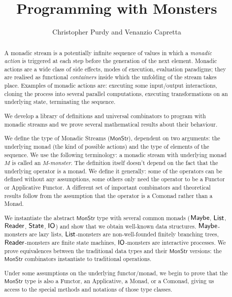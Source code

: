 \documentclass{article}
\title{Programming with Monsters}
\author{Christopher Purdy and Venanzio Capretta}
\begin{document}


\maketitle

\begin{abstract}
A monadic stream is a potentially infinite sequence of values in which a {\em monadic action} is triggered at each step before the generation of the next element.
Monadic actions are a wide class of side effects, modes of execution, evaluation paradigms; they are realised as functional {\em containers} inside which the unfolding of the stream takes place.
Examples of monadic actions are: executing some input/output interactions, cloning the process into several parallel computations, executing transformations on an underlying state, terminating the sequence.

We develop a library of definitions and universal combinators to program with monadic streams and we prove several mathematical results about their behaviour.

We define the type of Monadic Streams ($\mathsf{MonStr}$), dependent on two arguments: the underlying monad (the kind of possible actions) and the type of elements of the sequence.
We use the following terminology: a monadic stream with underlying monad $M$ is called an $M$-\emph{monster}.
The definition itself doesn't depend on the fact that the underlying operator is a monad.
We define it generally: some of the operators can be defined without any assumptions, some others only need the operator to be a Functor or Applicative Functor.
A different set of important combinators and theoretical results follow from the assumption that the operator is a Comonad rather than a Monad.

We instantiate the abstract $\mathsf{MonStr}$ type with several common monads ($\mathsf{Maybe}$, $\mathsf{List}$, $\mathsf{Reader}$, $\mathsf{State}$, $\mathsf{IO}$) and show that we obtain well-known data structures.
$\mathsf{Maybe}$-monsters are lazy lists, $\mathsf{List}$-monsters are non-well-founded finitely branching trees, $\mathsf{Reader}$-monsters are finite state machines, $\mathsf{IO}$-monsters are interactive processes.
We prove equivalences between the traditional data types and their $\mathsf{MonStr}$ versions: the $\mathsf{MonStr}$ combinators instantiate to traditional operations.

Under some assumptions on the underlying functor/monad, we begin to prove that the $\mathsf{MonStr}$ type is also a Functor, an Applicative, a Monad, or a Comonad, giving us access to the special methods and notations of those type classes.
\end{abstract}



\newpage





\newpage





\newpage








\end{document}
